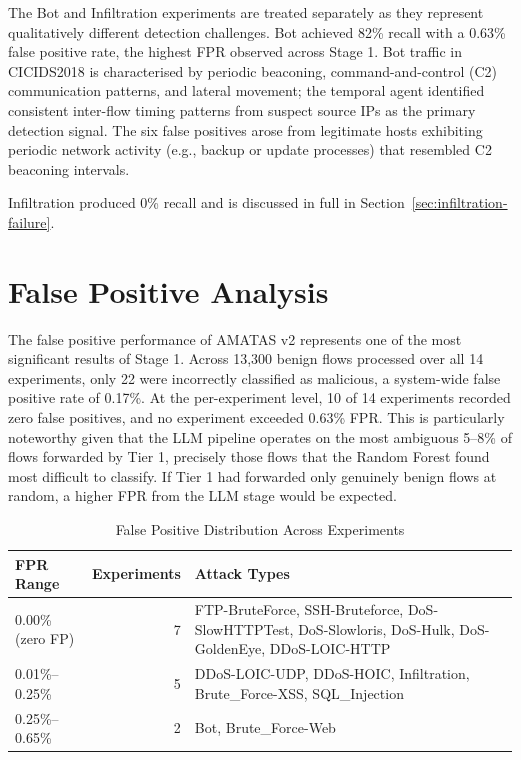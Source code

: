 \documentclass[../main.tex]{subfiles}
\begin{document}
The Bot and Infiltration experiments are treated separately as they represent qualitatively different detection challenges. Bot achieved 82\% recall with a 0.63\% false positive rate, the highest FPR observed across Stage 1. Bot traffic in CICIDS2018 is characterised by periodic beaconing, command-and-control (C2) communication patterns, and lateral movement; the temporal agent identified consistent inter-flow timing patterns from suspect source IPs as the primary detection signal. The six false positives arose from legitimate hosts exhibiting periodic network activity (e.g., backup or update processes) that resembled C2 beaconing intervals.

Infiltration produced 0\% recall and is discussed in full in Section~\ref{sec:infiltration-failure}.

\section{False Positive Analysis}
\label{sec:false-positive-analysis}

The false positive performance of AMATAS v2 represents one of the most significant results of Stage 1. Across 13,300 benign flows processed over all 14 experiments, only 22 were incorrectly classified as malicious, a system-wide false positive rate of 0.17\%. At the per-experiment level, 10 of 14 experiments recorded zero false positives, and no experiment exceeded 0.63\% FPR. This is particularly noteworthy given that the LLM pipeline operates on the most ambiguous 5--8\% of flows forwarded by Tier 1, precisely those flows that the Random Forest found most difficult to classify. If Tier 1 had forwarded only genuinely benign flows at random, a higher FPR from the LLM stage would be expected.

\begin{table}[H]
\centering
\caption{False Positive Distribution Across Experiments}
\label{tab:fp-distribution}
\begin{tabularx}{\textwidth}{l r X}
\toprule
FPR Range & Experiments & Attack Types \\
\midrule
0.00\% (zero FP) & 7 & FTP-BruteForce, SSH-Bruteforce, DoS-SlowHTTPTest, DoS-Slowloris, DoS-Hulk, DoS-GoldenEye, DDoS-LOIC-HTTP \\
0.01\%--0.25\% & 5 & DDoS-LOIC-UDP, DDoS-HOIC, Infiltration, Brute\_Force-XSS, SQL\_Injection \\
0.25\%--0.65\% & 2 & Bot, Brute\_Force-Web \\
\bottomrule
\end{tabularx}
\end{table}
\end{document}
